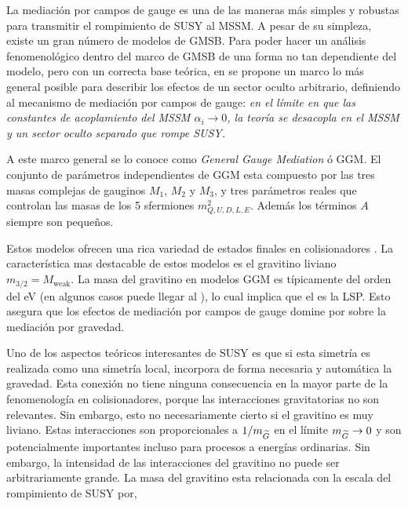 
La mediación por campos de gauge es una de las maneras más simples y robustas
para transmitir el rompimiento de SUSY al MSSM. A pesar de su simpleza, existe
un gran número de modelos de GMSB. Para poder hacer un análisis fenomenológico
dentro del marco de GMSB de una forma no tan dependiente del modelo, pero con un
correcta base teórica, en \cite{GGM} se propone un marco lo más general posible
para describir los efectos de un sector oculto arbitrario,
definiendo al mecanismo de mediación por campos de gauge:
\emph{en el límite en que las constantes de acoplamiento del MSSM $\alpha_i \to
  0$, la teoría se desacopla en el MSSM y un sector oculto separado que rompe
  SUSY.}

A este marco general se lo conoce como \emph{General Gauge Mediation} ó GGM. El
conjunto de parámetros independientes de GGM esta compuesto por las tres masas
complejas de gauginos $M_1$, $M_2$ y $M_3$, y tres parámetros reales que
controlan las masas de los 5 sfermiones $m^2_{Q,U,D,L,E}$. Además los términos
$A$ siempre son pequeños.

Estos modelos ofrecen una rica variedad de estados finales en colisionadores
\cite{0911.4130}. La característica mas destacable de estos modelos es el
gravitino liviano $m_{3/2} = M_\text{weak}$. La masa del gravitino en modelos
GGM es típicamente del orden del eV (en algunos casos puede llegar al \gev), lo
cual implica que el {\gravino} es la LSP. Esto asegura que los efectos de
mediación por campos de gauge domine por sobre la mediación por gravedad.

Uno de los aspectos teóricos interesantes de SUSY es que si esta simetría es
realizada como una simetría local, incorpora de forma necesaria y automática la
gravedad. Esta conexión no tiene ninguna consecuencia en la mayor parte de la
fenomenología en colisionadores, porque las interacciones gravitatorias no son
relevantes. Sin embargo, esto no necesariamente cierto si el gravitino es muy
liviano.
Estas interacciones son proporcionales a $1/m_{\widetilde{G}}$ en el límite
$m_{\widetilde{G}} \rightarrow 0$ y son potencialmente importantes incluso para procesos a
energías ordinarias. Sin embargo, la intensidad de las interacciones del
gravitino no puede ser arbitrariamente grande. La masa del gravitino esta
relacionada con la escala del rompimiento de SUSY por,

